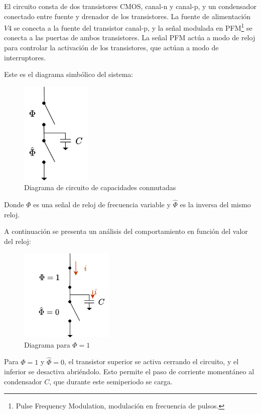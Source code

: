 \documentclass[12pt]{report} %
\begin{document}
	El circuito consta de dos transistores CMOS, canal-n y canal-p, y un condensador conectado entre fuente y drenador de los transistores. La fuente de alimentación $V4$ se conecta a la fuente del transistor canal-p, y la señal modulada en PFM\footnote{Pulse Frequency Modulation, modulación en frecuencia de pulsos.} se conecta a las puertas de ambos transistores. La señal PFM actúa a modo de reloj para controlar la activación de los transistores, que actúan a modo de interruptores.
	
	Este es el diagrama simbólico del sistema:
	
	\begin{figure}[H]
		\includegraphics[width=0.3\textwidth]{sw-capacities-symbol-1.png}
		\caption[Diagrama de circuito de capacidades conmutadas]{Diagrama de circuito de capacidades conmutadas}
		\label{fig:sw-capacities-symbol-1.png}
	\end{figure}

	Donde $\Phi$ es una señal de reloj de frecuencia variable y $\hat{\Phi}$ es la inversa del mismo reloj.
	
	A continuación se presenta un análisis del comportamiento en función del valor del reloj:
	
	\begin{figure}[H]
		\includegraphics[width=0.4\textwidth]{sw-capacities-symbol-2.png}
		\caption[Diagrama para $\Phi=1$]{Diagrama para $\Phi=1$}
		\label{fig:sw-capacities-symbol-2.png}
	\end{figure}
	Para $\Phi = 1$ y $\hat{\Phi} = 0$, el transistor superior se activa cerrando el circuito, y el inferior se desactiva abriéndolo. Esto permite el paso de corriente momentáneo al condensador $C$, que durante este semiperiodo se carga.
	
\end{document}
